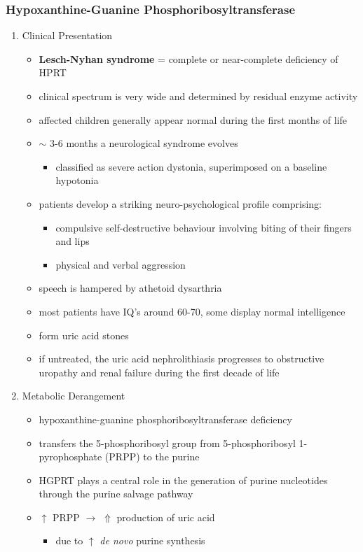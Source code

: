 \documentclass{scrartcl}
\begin{document}
\subsubsection{Hypoxanthine-Guanine Phosphoribosyltransferase}
\label{sec:org8cefabe}
\begin{enumerate}
\item Clinical Presentation
\label{sec:orgc4f44ae}
\begin{itemize}
\item \textbf{Lesch-Nyhan syndrome} = complete or near-complete deficiency of HPRT
\item clinical spectrum is very wide and determined by residual enzyme activity
\item affected children generally appear normal during the first months of
life
\item \(\sim\) 3-6 months a neurological syndrome evolves
\begin{itemize}
\item classified as severe action dystonia, superimposed on a baseline hypotonia
\end{itemize}
\item patients develop a striking neuro-psychological profile comprising:
\begin{itemize}
\item compulsive self-destructive behaviour involving biting of their
fingers and lips
\item physical and verbal aggression
\end{itemize}
\item speech is hampered by athetoid dysarthria
\item most patients have IQ’s around 60-70, some display normal intelligence
\item form uric acid stones
\item if untreated, the uric acid nephrolithiasis progresses to
obstructive uropathy and renal failure during the first decade of
life
\end{itemize}

\item Metabolic Derangement
\label{sec:org5b7a47f}
\begin{itemize}
\item hypoxanthine-guanine phosphoribosyltransferase deficiency
\end{itemize}
\begin{itemize}
\item transfers the 5-phosphoribosyl group from 5-phosphoribosyl
1-pyrophosphate (PRPP) to the purine
\item HGPRT plays a central role in the generation of purine nucleotides
through the purine salvage pathway
\item \(\uparrow\) PRPP \(\to\) \(\Uparrow\) production of uric acid
\begin{itemize}
\item due to \(\uparrow\) \emph{de novo} purine synthesis
\end{itemize}
\end{itemize}


\end{enumerate}
\end{document}
